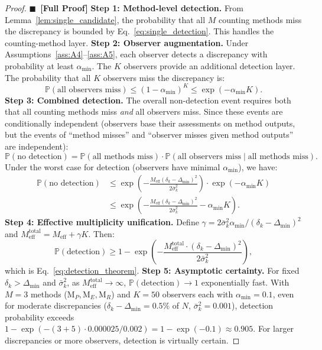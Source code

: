 \documentclass[11pt,a4paper]{article}
\theoremstyle{definition}
\newcommand{\rigorFull}[0]{$\blacksquare$~\textbf{[Full Proof]}}
\newcommand{\Pbb}{\mathbb{P}}
\newcommand{\method}[1]{\mathrm{M}_{#1}}
\begin{document}
\begin{proof}\rigorFull
\textbf{Step 1: Method-level detection.} From Lemma~\ref{lem:single_candidate}, the probability that all $M$ counting methods miss the discrepancy is bounded by Eq.~\eqref{eq:single_detection}. This handles the counting-method layer.
\textbf{Step 2: Observer augmentation.} Under Assumptions~\ref{ass:A4}--\ref{ass:A5}, each observer detects a discrepancy with probability at least $\alpha_{\min}$. The $K$ observers provide an additional detection layer. The probability that all $K$ observers miss the discrepancy is:
\begin{equation}
    \Pbb(\text{all observers miss}) \leq (1 - \alpha_{\min})^K \leq \exp(-\alpha_{\min} K).
    \label{eq:observer_miss}
\end{equation}
\textbf{Step 3: Combined detection.} The overall non-detection event requires both that all counting methods miss \textit{and} all observers miss. Since these events are conditionally independent (observers base their assessments on method outputs, but the events of ``method misses'' and ``observer misses given method outputs'' are independent):
\begin{equation}
    \Pbb(\text{no detection}) = \Pbb(\text{all methods miss}) \cdot \Pbb(\text{all observers miss} \mid \text{all methods miss}).
    \label{eq:combined}
\end{equation}
Under the worst case for detection (observers have minimal $\alpha_{\min}$), we have:
\begin{align}
    \Pbb(\text{no detection}) &\leq \exp\left(-\frac{M_{\text{eff}} (\delta_k - \Delta_{\min})^2}{2\bar{\sigma}_k^2}\right) \cdot \exp(-\alpha_{\min} K) \\
    &\leq \exp\left(-\frac{M_{\text{eff}} (\delta_k - \Delta_{\min})^2}{2\bar{\sigma}_k^2} - \alpha_{\min} K\right).
    \label{eq:combined_bound}
\end{align}
\textbf{Step 4: Effective multiplicity unification.} Define $\gamma = 2 \bar{\sigma}_k^2 \alpha_{\min} / (\delta_k - \Delta_{\min})^2$ and $M_{\text{eff}}^{\text{total}} = M_{\text{eff}} + \gamma K$. Then:
\begin{equation}
    \Pbb(\text{detection}) \geq 1 - \exp\left(-\frac{M_{\text{eff}}^{\text{total}} \cdot (\delta_k - \Delta_{\min})^2}{2\bar{\sigma}_k^2}\right),
    \label{eq:unified_bound}
\end{equation}
which is Eq.~\eqref{eq:detection_theorem}.
\textbf{Step 5: Asymptotic certainty.} For fixed $\delta_k > \Delta_{\min}$ and $\bar{\sigma}_k^2$, as $M_{\text{eff}}^{\text{total}} \to \infty$, $\Pbb(\text{detection}) \to 1$ exponentially fast. With $M = 3$ methods ($\method{P}, \method{E}, \method{R}$) and $K = 50$ observers each with $\alpha_{\min} = 0.1$, even for moderate discrepancies ($\delta_k - \Delta_{\min} = 0.5\%$ of $N$, $\bar{\sigma}_k^2 = 0.001$), detection probability exceeds $1 - \exp(-(3 + 5) \cdot 0.000025 / 0.002) = 1 - \exp(-0.1) \approx 0.905$. For larger discrepancies or more observers, detection is virtually certain.

\end{proof}
\end{document}
